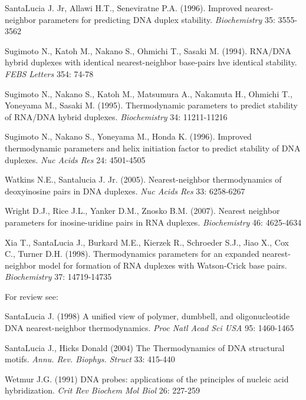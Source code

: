 \documentclass{article}
\begin{document}
  SantaLucia J. Jr, Allawi H.T., Seneviratne P.A. (1996). Improved 
nearest-neighbor parameters for predicting DNA duplex stability. \textit{Biochemistry} 
35: 3555-3562   

  Sugimoto N., Katoh M., Nakano S., Ohmichi T., Sasaki M. (1994). 
RNA/DNA hybrid duplexes with identical nearest-neighbor base-pairs hve identical 
stability. \textit{FEBS Letters} 354: 74-78   

  Sugimoto N., Nakano S., Katoh M., Matsumura 
A., Nakamuta H., Ohmichi T., Yoneyama M., Sasaki M. (1995). Thermodynamic parameters 
to predict stability of RNA/DNA hybrid duplexes. \textit{Biochemistry} 34: 11211-11216 
  
  Sugimoto N., Nakano S., Yoneyama M., Honda K. (1996).  Improved thermodynamic 
parameters and helix initiation factor to predict stability of DNA duplexes. 
\textit{Nuc Acids Res}  24: 4501-4505  

Watkins N.E., Santalucia J. Jr. (2005). Nearest-neighbor thermodynamics of deoxyinosine 
pairs in DNA duplexes. \textit{Nuc Acids Res} 33: 6258-6267 

Wright D.J., Rice J.L., Yanker D.M., Znosko B.M. (2007). Nearest neighbor parameters for 
inosine-uridine pairs in RNA duplexes. \textit{Biochemistry} 46: 4625-4634

  Xia T., SantaLucia J., Burkard M.E., Kierzek 
R., Schroeder S.J., Jiao X., Cox C., Turner D.H. (1998). Thermodynamics parameters 
for an expanded nearest-neighbor model for formation of RNA duplexes with 
Watson-Crick base pairs. \textit{Biochemistry}  37: 14719-14735   

  For review see: 
  
  SantaLucia J. (1998) A unified view of polymer, dumbbell, and oligonucleotide 
DNA nearest-neighbor thermodynamics. \textit{Proc Natl Acad Sci USA}  95: 1460-1465 

SantaLucia  J., Hicks Donald (2004) The Thermodynamics of DNA structural motifs. 
\textit{Annu. Rev. Biophys. Struct} 33: 415-440 
  
  Wetmur J.G. (1991) DNA probes: applications of the principles of nucleic 
acid hybridization. \textit{Crit Rev Biochem Mol Biol} 26: 227-259   
   
\end{document}
